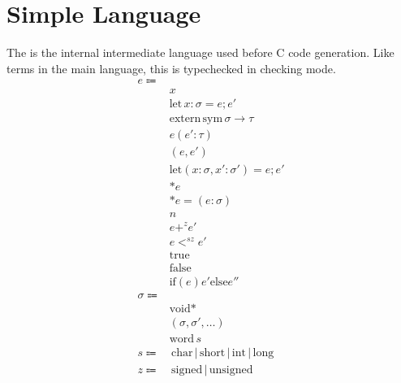 \documentclass {article}
\begin{document}
\section{Simple Language}
The is the internal intermediate language used before C code generation.
Like terms in the main language, this is typechecked in checking mode.
\begin{align*}
e \Coloneqq & \\
& x \\
& \text{let} \, x : \sigma = e; e' \\
& \text{extern} \, \text{sym} \, \sigma \to \tau \\
& e(e' : \tau) \\
& (e,e') \\
& \text{let} (x: \sigma, x' : \sigma') = e; e' \\
& * e \\
& * e = (e : \sigma) \\
& n \\
& e +^z e' \\
& e <^{sz} e' \\
& \text{true} \\
& \text{false} \\
& \text{if} (e) {e'} \text{else} {e''} \\
\sigma \Coloneqq & \\
& \text{void}* \\ 
& (\sigma, \sigma', \dots) \\
& \text{word} \, s \\
s \Coloneqq & \, \text{char} \, | \, \text{short} \, | \, \text{int} \, | \, \text{long} \\
z \Coloneqq & \, \text{signed} \, | \, \text{unsigned}
\end{align*}
\end{document}
